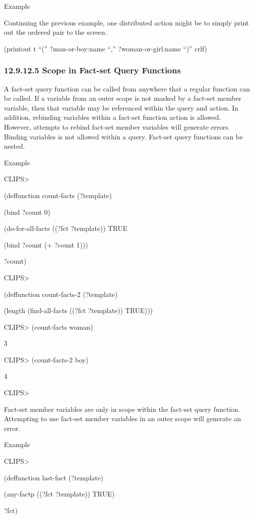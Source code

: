 \documentclass[letterpaper,10pt,english]{sphinxmanual}
\begin{document}
Example

Continuing the previous example, one distributed action might be to
simply print out the ordered pair to the screen.

(printout t “(” ?man-or-boy:name “,” ?woman-or-girl:name “)” crlf)


\subsubsection{12.9.12.5 Scope in Fact-set Query Functions}
\label{\detokenize{actions:scope-in-fact-set-query-functions}}
A fact-set query function can be called from anywhere that a regular
function can be called. If a variable from an outer scope is not masked
by a fact-set member variable, then that variable may be referenced
within the query and action. In addition, rebinding variables within a
fact-set function action is allowed. However, attempts to rebind
fact-set member variables will generate errors. Binding variables is not
allowed within a query. Fact-set query functions can be nested.

Example

CLIPS\textgreater{}

(deffunction count-facts (?template)

(bind ?count 0)

(do-for-all-facts ((?fct ?template)) TRUE

(bind ?count (+ ?count 1)))

?count)

CLIPS\textgreater{}

(deffunction count-facts-2 (?template)

(length (find-all-facts ((?fct ?template)) TRUE)))

CLIPS\textgreater{} (count-facts woman)

3

CLIPS\textgreater{} (count-facts-2 boy)

4

CLIPS\textgreater{}

Fact-set member variables are only in scope within the fact-set query
function. Attempting to use fact-set member variables in an outer scope
will generate an error.

Example

CLIPS\textgreater{}

(deffunction last-fact (?template)

(any-factp ((?fct ?template)) TRUE)

?fct)
\end{document}
